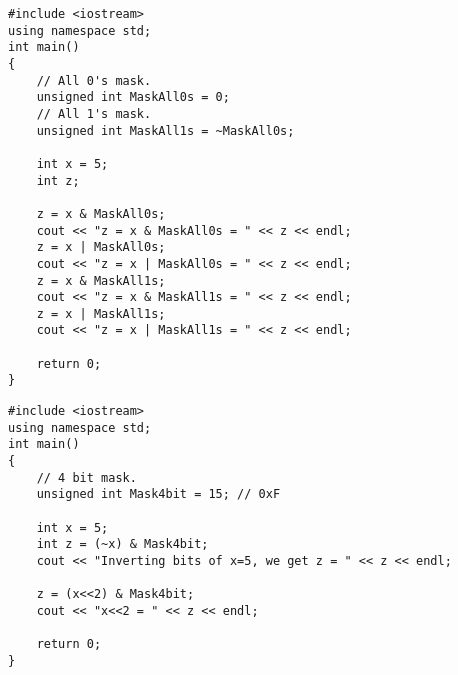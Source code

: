 \documentclass[12pt,a4paper]{article}
\begin{document}
\begin{lstlisting}[caption={Example: Masking}]
#include <iostream> 
using namespace std; 
int main()
{
	// All 0's mask.
	unsigned int MaskAll0s = 0;
	// All 1's mask.
	unsigned int MaskAll1s = ~MaskAll0s;
	
	int x = 5;
	int z;
	
	z = x & MaskAll0s;
	cout << "z = x & MaskAll0s = " << z << endl;
	z = x | MaskAll0s;
	cout << "z = x | MaskAll0s = " << z << endl;
	z = x & MaskAll1s;
	cout << "z = x & MaskAll1s = " << z << endl;
	z = x | MaskAll1s;
	cout << "z = x | MaskAll1s = " << z << endl;

	return 0;
}
\end{lstlisting}
\begin{lstlisting}[caption={Example: Masking 4 bits}]
#include <iostream> 
using namespace std; 
int main()
{
	// 4 bit mask.
	unsigned int Mask4bit = 15; // 0xF
	
	int x = 5;
	int z = (~x) & Mask4bit;
	cout << "Inverting bits of x=5, we get z = " << z << endl;
	
	z = (x<<2) & Mask4bit;
	cout << "x<<2 = " << z << endl;
	
	return 0;
}
\end{lstlisting}
\end{document}
